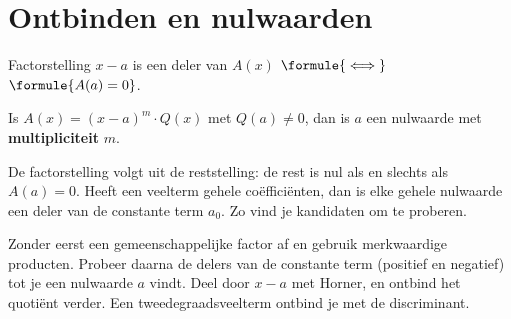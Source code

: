 \section{Ontbinden en nulwaarden}

\begin{theorie}
\begin{stelling}{Factorstelling}
$x - a$ is een deler van $A(x)$ \quad $\formule{\iff}$ \quad $\formule{A(a) = 0}$.
\end{stelling}
Is $A(x) = (x - a)^m \cdot Q(x)$ met $Q(a) \neq 0$, dan is $a$ een nulwaarde met \textbf{\textcolor{accent}{multipliciteit}} $m$.
\end{theorie}

De factorstelling volgt uit de reststelling: de rest is nul als en slechts als $A(a) = 0$. Heeft een veelterm gehele coëfficiënten, dan is elke gehele nulwaarde een deler van de constante term $a_0$. Zo vind je kandidaten om te proberen.


\begin{werkwijze}
Zonder eerst een gemeenschappelijke factor af en gebruik merkwaardige producten. Probeer daarna de delers van de constante term (positief en negatief) tot je een nulwaarde $a$ vindt. Deel door $x - a$ met Horner, en ontbind het quotiënt verder. Een tweedegraadsveelterm ontbind je met de discriminant.
\end{werkwijze}

